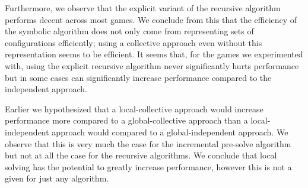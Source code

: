 Furthermore, we observe that the explicit variant of the recursive algorithm performs decent across most games. We conclude from this that the efficiency of the symbolic algorithm does not only come from representing sets of configurations efficiently; using a collective approach even without this representation seems to be efficient. It seems that, for the games we experimented with, using the explicit recursive algorithm never significantly hurts performance but in some cases can significantly increase performance compared to the independent approach.

Earlier we hypothesized that a local-collective approach would increase performance more compared to a global-collective approach than a local-independent approach would compared to a global-independent approach. We observe that this is very much the case for the incremental pre-solve algorithm but not at all the case for the recursive algorithms. We conclude that local solving has the potential to greatly increase performance, however this is not a given for just any algorithm.
